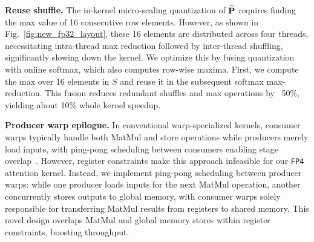 \textbf{Reuse shuffle.} 
The in-kernel micro-scaling quantization of $\widetilde {\mathbf{P}}$ requires finding the max value of 16 consecutive row elements. However, as shown in Fig.~\ref{fig:new_fp32_layout}, these 16 elements are distributed across four threads, necessitating intra-thread max reduction followed by inter-thread shuffling, significantly slowing down the kernel.
We optimize this by fusing quantization with online softmax, which also computes row-wise maxima. First, we compute the max over 16 elements in $S$ and reuse it in the subsequent softmax max-reduction. This fusion reduces redundant shuffles and max operations by ~50\%, yielding about 10\% whole kernel speedup.



\textbf{Producer warp epilogue.} 
In conventional warp-specialized kernels, consumer warps typically handle both MatMul and store operations while producers merely load inputs, with ping-pong scheduling between consumers enabling stage overlap~\citep{nvidia2025efficientgemm}. However, register constraints make this approach infeasible for our \texttt{FP4} attention kernel. Instead, we implement ping-pong scheduling between producer warps: while one producer loads inputs for the next MatMul operation, another concurrently stores outputs to global memory, with consumer warps solely responsible for transferring MatMul results from registers to shared memory. This novel design overlaps MatMul and global memory stores within register constraints, boosting throughput.







